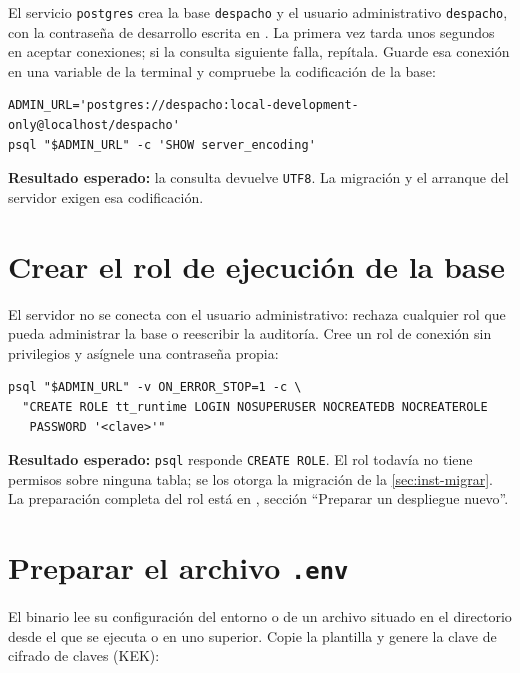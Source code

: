 El servicio \texttt{postgres} crea la base \texttt{despacho} y el usuario
administrativo \texttt{despacho}, con la contraseña de desarrollo escrita en
. La primera vez tarda unos segundos en aceptar
conexiones; si la consulta siguiente falla, repítala. Guarde esa conexión en
una variable de la terminal y compruebe la codificación de la base:

\begin{verbatim}
ADMIN_URL='postgres://despacho:local-development-only@localhost/despacho'
psql "$ADMIN_URL" -c 'SHOW server_encoding'
\end{verbatim}

\textbf{Resultado esperado:} la consulta devuelve \texttt{UTF8}. La
migración y el arranque del servidor exigen esa codificación.

\section{Crear el rol de ejecución de la base}\label{sec:inst-rol}

El servidor no se conecta con el usuario administrativo: rechaza cualquier
rol que pueda administrar la base o reescribir la auditoría. Cree un rol de
conexión sin privilegios y asígnele una contraseña propia:

\begin{verbatim}
psql "$ADMIN_URL" -v ON_ERROR_STOP=1 -c \
  "CREATE ROLE tt_runtime LOGIN NOSUPERUSER NOCREATEDB NOCREATEROLE
   PASSWORD '<clave>'"
\end{verbatim}

\textbf{Resultado esperado:} \texttt{psql} responde \texttt{CREATE ROLE}.
El rol todavía no tiene permisos sobre ninguna tabla; se los otorga la
migración de la \cref{sec:inst-migrar}. La preparación completa del rol está
en \archivo{docs/database-operations.md}, sección \enquote{Preparar un
despliegue nuevo}.

\section{Preparar el archivo \texttt{.env}}\label{sec:inst-env}

El binario lee su configuración del entorno o de un archivo 
situado en el directorio desde el que se ejecuta o en uno superior. Copie
la plantilla y genere la clave de cifrado de claves (KEK):

